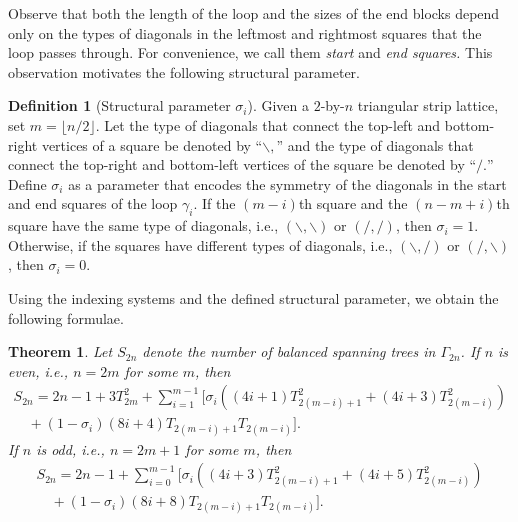 \documentclass{amsart}
\newtheorem{theorem}{Theorem}[section]
\theoremstyle{definition}
\newtheorem{defn}{Definition}
\newcommand{\yandi}[1]{\marginpar{\tiny \color{red} Yandi: #1}}
\newcommand{\longnguyen}[1]
{\marginpar{\tiny \color{purple} Long: #1}}
\begin{document}
Observe that both the length of the loop and the sizes of the end blocks depend only on the types of diagonals in the leftmost and rightmost squares that the loop passes through. For convenience, we call them \emph{start} and \emph{end squares.} This observation motivates the following structural parameter.

\begin{defn}[Structural parameter $\sigma_i$]
Given a $2$-by-$n$ triangular strip lattice, set $m=\lfloor n/2 \rfloor$. Let the type of diagonals that connect the top-left and bottom-right vertices of a square be denoted by ``$\backslash,$'' and the type of diagonals that connect the top-right and bottom-left vertices of the square be denoted by ``$/.$'' Define $\sigma_i$ as a parameter that encodes the symmetry of the diagonals in the start and end squares of the loop $\gamma_i$. If the $(m-i)$th square and the $(n-m+i)$th square have the same type of diagonals, i.e., $(\backslash,\backslash)$ or $(/,/)$, then $\sigma_i=1.$ Otherwise, if the squares have different types of diagonals, i.e., $(\backslash,/)$ or $(/,\backslash)$, then $\sigma_i = 0.$
\end{defn}

Using the indexing systems and the defined structural parameter, we obtain the following formulae.
\begin{theorem}\label{thm:Snforheterogeneous}
Let $S_{2n}$ denote the number of balanced spanning trees in $\Gamma_{2n}$. If $n$ is even, i.e., $n=2m$ for some $m$, then
\begin{align*}
S_{2n} = 2n-1+ 3T_{2m}^2 +\sum_{i=1}^{m-1}[\sigma_i((4i+1)T_{2(m-i)+1}^2+(4i+3)T_{2(m-i)}^2)\\
\quad +(1-\sigma_i)(8i+4)T_{2(m-i)+1}T_{2(m-i)}].
\end{align*}
If $n$ is odd, i.e., $n = 2m+1$ for some $m$, then
\begin{align*}
S_{2n} = 2n-1+ \sum_{i=0}^{m-1}[\sigma_i((4i+3)T_{2(m-i)+1}^2+(4i+5)T_{2(m-i)}^2)\\
\quad+(1-\sigma_i)(8i+8)T_{2(m-i)+1}T_{2(m-i)}].
\end{align*}
\end{theorem}
\par \medskip
\end{document}
